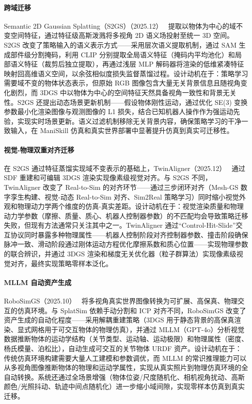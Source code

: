 \paragraph{跨域迁移}

Semantic 2D Gaussian Splatting（S2GS）（2025.12）~\cite{2512_04731} 提取以物体为中心的域不变空间特征，通过特征级高斯泼溅将多视角 2D 语义场投射至统一 3D 空间。S2GS 改变了策略输入的语义表示方式——采用层次语义提取机制，通过 SAM 生成部件级分割掩码，利用 CLIP 分别提取全局语义特征（掩码内平均池化）和局部语义特征（裁剪后独立提取），再通过浅层 MLP 解码器将渲染的低维紧凑特征映射回高维语义空间，以余弦相似度损失监督蒸馏过程。设计动机在于：策略学习需要域不变的物体状态表示，但原始 RGB 图像包含大量无关背景信息且随视角变化剧烈，而 3DGS 中以物体为中心的空间特征天然具备视角一致性和背景无关性。S2GS 还提出动态场景更新机制——假设物体刚性运动，通过优化 SE(3) 变换参数最小化渲染图像与观测图像的 L1 损失，结合已知机器人操作作为强运动先验，实现实时场景更新。语义过滤机制移除无关背景内容，确保策略学习的干净一致输入，在 ManiSkill 仿真和真实世界部署中显著提升仿真到真实可迁移性。

\paragraph{视觉-物理双重对齐迁移}

在 S2GS 通过特征蒸馏实现域不变表示的基础上，TwinAligner（2025.12）~\cite{2512_19390} 通过 SDF 重建和可编辑 3DGS 渲染实现像素级视觉对齐。与 S2GS 不同，TwinAligner 改变了 Real-to-Sim 的对齐环节——通过三步闭环对齐（Mesh-GS 数字孪生构建、视觉-动态 Real-to-Sim 对齐、Sim2Real 策略学习）同时缩小视觉外观和物理动力学两个维度的仿真-真实差距。设计动机在于：视觉渲染质量和物理动力学参数（摩擦、质量、质心、机器人控制器参数）的不匹配均会导致策略迁移失败，但现有方法通常只关注其中之一。TwinAligner 通过``Control-Hit-Slide''交互协议同时暴露多种物理属性——机器人控制阶段对齐控制器参数、撞击阶段确保脉冲一致、滑动阶段通过刚体运动方程优化摩擦系数和质心位置——实现物理参数的联合辨识，并通过 3DGS 渲染和梯度无关优化器（粒子群算法）实现像素级视觉对齐，最终实现策略零样本泛化。

\paragraph{MLLM 自动资产生成}

RoboSimGS（2025.10）~\cite{2510_10637} 将多视角真实世界图像转换为可扩展、高保真、物理交互的仿真环境。与 SplatSim 依赖手动分割和 ICP 对齐不同，RoboSimGS 改变了资产生成的自动化程度——采用解耦重建策略（3DGS 用于静态背景的高保真渲染、显式网格用于可交互物体的物理仿真），并通过 MLLM（GPT-4o）分析视觉数据推断物体的运动学结构（关节类型、运动轴、运动极限）和物理属性（密度、杨氏模量、泊松比），自动生成可交互的关节物体 URDF 资产。设计动机在于：传统仿真环境构建需要大量人工建模和参数调优，而 MLLM 的常识推理能力可以从多视角图像推断物体的物理和运动学属性，实现从真实照片到物理仿真环境的全自动转换。系统还通过全场景增强（物体位姿/尺度随机化、相机视角扰动、高斯颜色/光照抖动、轨迹中间点随机化）进一步缩小域间隙，实现零样本仿真到真实迁移。

